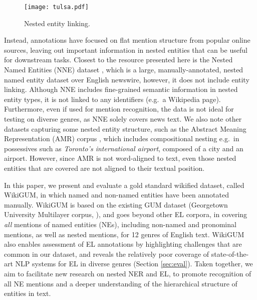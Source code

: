 \documentclass[11pt,a4paper]{article}
\begin{document}
\begin{figure}[h!tb]
\centering
\texttt{[image: tulsa.pdf]}
\caption{Nested entity linking.}
\label{fig:model_architecture}
\par\vspace{-10pt}\par
\end{figure}\label{fig:nested}


Instead, annotations have focused on flat mention structure from popular online sources, leaving out important information in nested entities that can be useful for downstream tasks. Closest to the resource presented here is the Nested Named Entities (NNE) dataset \cite{ringland2019nne}, which is a large, manually-annotated, nested named entity dataset over English newswire, however, it does not include entity linking. Although NNE includes fine-grained semantic information in nested entity types, it is not linked to any identifiers (e.g.~a Wikipedia page).
Furthermore, even if used for mention recognition, the data is not ideal for testing on diverse genres, as NNE solely covers news text. We also note other datasets capturing some nested entity structure, such as the Abstract Meaning Representation (AMR) corpus \citep{banarescu2013amr}, which includes compositional nesting e.g.~in possessives such as \textit{Toronto's international airport}, composed of a city and an airport. However, since AMR is not word-aligned to text, even those nested entities that are covered are not aligned to their textual position. \par

In this paper, we present and evaluate a gold standard wikified dataset, called WikiGUM, in which named and non-named entities have been annotated manually. WikiGUM is based on the existing GUM dataset (Georgetown University Multilayer corpus, \citealt{zeldes2017gum}), and goes beyond other EL corpora, in covering \textit{all} mentions of named entities (NEs), including non-named and pronominal mentions, as well as nested mentions, for 12 genres of English text. WikiGUM also enables assessment of EL annotations by highlighting challenges that are common in our dataset, and reveals the relatively poor coverage of state-of-the-art NLP systems for EL in diverse genres (Section \ref{sec:eval}). Taken together, we aim to facilitate new research on nested NER and EL, to promote recognition of all NE mentions and a deeper understanding of the hierarchical structure of entities in text.
\end{document}
